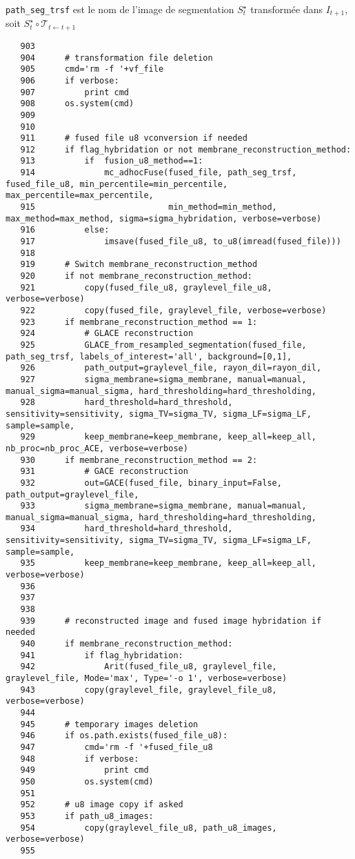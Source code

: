 \documentclass{article}
\def \mycolor {red}
\begin{document}
\color{\mycolor}
\verb|path_seg_trsf| est le nom de l'image de segmentation $S^{\star}_t$ transform\'ee dans $I_{t+1}$, soit
$S^{\star}_t \circ \mathcal{T}_{t \leftarrow t+1}$
\color{black}
\begin{verbatim}  
   903	
   904	    # transformation file deletion
   905	    cmd='rm -f '+vf_file
   906	    if verbose:
   907	        print cmd
   908	    os.system(cmd)
   909	
   910	
   911	    # fused file u8 vconversion if needed
   912	    if flag_hybridation or not membrane_reconstruction_method:
   913	        if  fusion_u8_method==1:
   914	            mc_adhocFuse(fused_file, path_seg_trsf, fused_file_u8, min_percentile=min_percentile, max_percentile=max_percentile, 
   915	                         min_method=min_method, max_method=max_method, sigma=sigma_hybridation, verbose=verbose)
   916	        else:
   917	            imsave(fused_file_u8, to_u8(imread(fused_file)))
   918	
   919	    # Switch membrane_reconstruction_method
   920	    if not membrane_reconstruction_method:
   921	        copy(fused_file_u8, graylevel_file_u8, verbose=verbose)
   922	        copy(fused_file, graylevel_file, verbose=verbose)
   923	    if membrane_reconstruction_method == 1:
   924	        # GLACE reconstruction 
   925	        GLACE_from_resampled_segmentation(fused_file, path_seg_trsf, labels_of_interest='all', background=[0,1], 
   926	        path_output=graylevel_file, rayon_dil=rayon_dil, 
   927	        sigma_membrane=sigma_membrane, manual=manual, manual_sigma=manual_sigma, hard_thresholding=hard_thresholding, 
   928	        hard_threshold=hard_threshold, sensitivity=sensitivity, sigma_TV=sigma_TV, sigma_LF=sigma_LF, sample=sample, 
   929	        keep_membrane=keep_membrane, keep_all=keep_all,  nb_proc=nb_proc_ACE, verbose=verbose)   
   930	    if membrane_reconstruction_method == 2:
   931	        # GACE reconstruction
   932	        out=GACE(fused_file, binary_input=False, path_output=graylevel_file, 
   933	        sigma_membrane=sigma_membrane, manual=manual, manual_sigma=manual_sigma, hard_thresholding=hard_thresholding, 
   934	        hard_threshold=hard_threshold, sensitivity=sensitivity, sigma_TV=sigma_TV, sigma_LF=sigma_LF, sample=sample, 
   935	        keep_membrane=keep_membrane, keep_all=keep_all, verbose=verbose)
   936	
   937	
   938	
   939	    # reconstructed image and fused image hybridation if needed
   940	    if membrane_reconstruction_method:
   941	        if flag_hybridation:
   942	            Arit(fused_file_u8, graylevel_file, graylevel_file, Mode='max', Type='-o 1', verbose=verbose)
   943	        copy(graylevel_file, graylevel_file_u8, verbose=verbose)
   944	
   945	    # temporary images deletion
   946	    if os.path.exists(fused_file_u8):
   947	        cmd='rm -f '+fused_file_u8
   948	        if verbose:
   949	            print cmd
   950	        os.system(cmd)
   951	
   952	    # u8 image copy if asked
   953	    if path_u8_images:
   954	        copy(graylevel_file_u8, path_u8_images, verbose=verbose)
   955	
\end{verbatim} 
\end{document}
